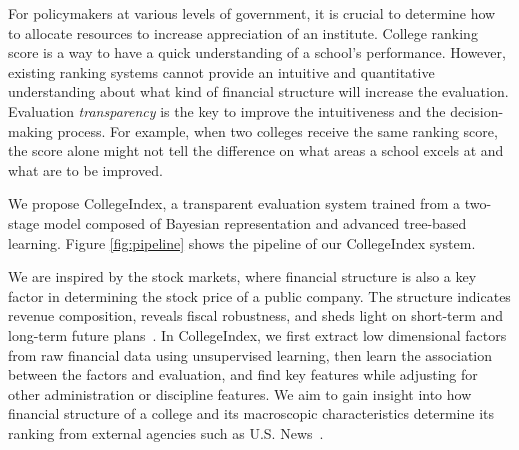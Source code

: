 \documentclass[11pt,letter]{article}
\begin{document}
For policymakers at various levels of government, 
it is crucial to determine how to allocate resources to increase appreciation of an institute. 
College ranking score is a way to have a quick understanding of a school's performance. However, existing ranking systems cannot provide an intuitive and quantitative understanding about what kind of financial structure will increase the evaluation.
Evaluation \emph{transparency} is the key to improve the intuitiveness and the decision-making process.
For example, when two colleges receive the same ranking score, the score alone might not tell the 
difference on what areas a school excels at and what are to be improved.

We propose CollegeIndex, a transparent evaluation system trained from a two-stage model composed of Bayesian representation and advanced tree-based learning. Figure \ref{fig:pipeline} shows the pipeline of our CollegeIndex system.  

We are inspired by the stock markets, where financial structure is also a key factor in determining the stock price of a public company. 
The structure indicates revenue composition, reveals fiscal robustness, and sheds light on short-term and long-term future plans~\cite{hagenau2013automated,hopkins1996effect,ou1989financial}. 
In CollegeIndex, we first extract low dimensional factors from raw financial data using unsupervised learning, then learn the association between the factors and evaluation, and find key features while adjusting for other administration or discipline features. We aim to gain insight into how financial structure of a college and its macroscopic characteristics determine its ranking from external agencies such as U.S. News~\cite{titus2006understanding}.
\end{document}

